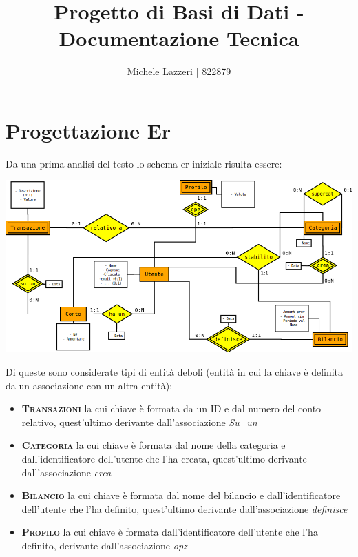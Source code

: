 \documentclass[a4paper,10pt]{article}
\title{Progetto di Basi di Dati - Documentazione Tecnica}
\author{Michele Lazzeri | 822879}
\date{}
\newcommand{\entita}[1]{\textsc{\textbf{#1}}}
\newcommand{\assoc}[1]{\textit{#1}}
\begin{document}
\maketitle
\section{Progettazione Er}
Da una prima analisi del testo lo schema er iniziale risulta essere:

\centerline{\includegraphics[scale=0.65]{ER.png}}




Di queste sono considerate tipi di entità deboli (entità in cui la chiave è definita da un associazione con un altra entità):
\begin{itemize}
\item \entita{Transazioni} la cui chiave è formata da un ID e dal numero del conto relativo, quest'ultimo derivante dall'associazione \assoc{Su\_{}un}
\item \entita{Categoria} la cui chiave è formata dal nome della categoria e dall'identificatore dell'utente che l'ha creata, quest'ultimo derivante dall'associazione \assoc{crea}
\item \entita{Bilancio} la cui chiave è formata dal nome del bilancio e dall'identificatore dell'utente che l'ha definito, quest'ultimo derivante dall'associazione \assoc{definisce}
\item \entita{Profilo} la cui chiave è formata dall'identificatore dell'utente che l'ha definito, derivante dall'associazione \assoc{opz}
\end{itemize}
\end{document}
